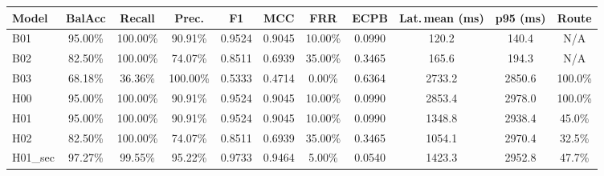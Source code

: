 \begin{tabular}{lcccccccccc}
\hline
Model & BalAcc & Recall & Prec. & F1 & MCC & FRR & ECPB & Lat.\,mean (ms) & p95 (ms) & Route \\
\hline
B01 & 95.00\% & 100.00\% & 90.91\% & 0.9524 & 0.9045 & 10.00\% & 0.0990 & 120.2 & 140.4 & N/A \\
B02 & 82.50\% & 100.00\% & 74.07\% & 0.8511 & 0.6939 & 35.00\% & 0.3465 & 165.6 & 194.3 & N/A \\
B03 & 68.18\% & 36.36\% & 100.00\% & 0.5333 & 0.4714 & 0.00\% & 0.6364 & 2733.2 & 2850.6 & 100.0\% \\
H00 & 95.00\% & 100.00\% & 90.91\% & 0.9524 & 0.9045 & 10.00\% & 0.0990 & 2853.4 & 2978.0 & 100.0\% \\
H01 & 95.00\% & 100.00\% & 90.91\% & 0.9524 & 0.9045 & 10.00\% & 0.0990 & 1348.8 & 2938.4 & 45.0\% \\
H02 & 82.50\% & 100.00\% & 74.07\% & 0.8511 & 0.6939 & 35.00\% & 0.3465 & 1054.1 & 2970.4 & 32.5\% \\
H01\_sec & 97.27\% & 99.55\% & 95.22\% & 0.9733 & 0.9464 & 5.00\% & 0.0540 & 1423.3 & 2952.8 & 47.7\% \\
\hline
\end{tabular}
